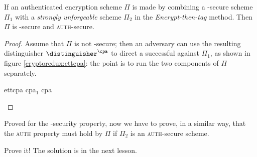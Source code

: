 \begin{theorem}
    If an authenticated encryption scheme $\Pi$ is made by combining a \cpa-secure \ske{} scheme $\Pi_1$ with a \emph{strongly unforgeable} \mac{} scheme $\Pi_2$ in the \emph{Encrypt-then-tag} method. Then $\Pi$ is \cpa-secure and \textsc{auth}-secure. 
\end{theorem}

\begin{proof}

    Assume that $\Pi$ is not \cpa-secure; then an adversary can use the resulting distinguisher $\distinguisher^{\cpa}$ to direct a successful \cpa{} against $\Pi_1$, as shown in figure \ref{cryptoredux:ettcpa}: the point is to run the two components of $\Pi$ separately.

    \begin{cryptoredux}
        {ettcpa}
        {}
        {cpa$_1$}
        {cpa}


        \cseqbeginloop
        \cseqendloop

        \cseqdelay
        

        \cseqdelay

        \cseqbeginloop
        \cseqendloop

        \cseqdelay


    \end{cryptoredux}


\end{proof}

Proved for the \cpa-security property, now we have to prove, in a similar way, that the \textsc{auth} property must hold by $\Pi$ if $\Pi_2$ is an \textsc{auth}-secure scheme.
\begin{exercise}
    Prove it! The solution is in the next lesson.
\end{exercise}
